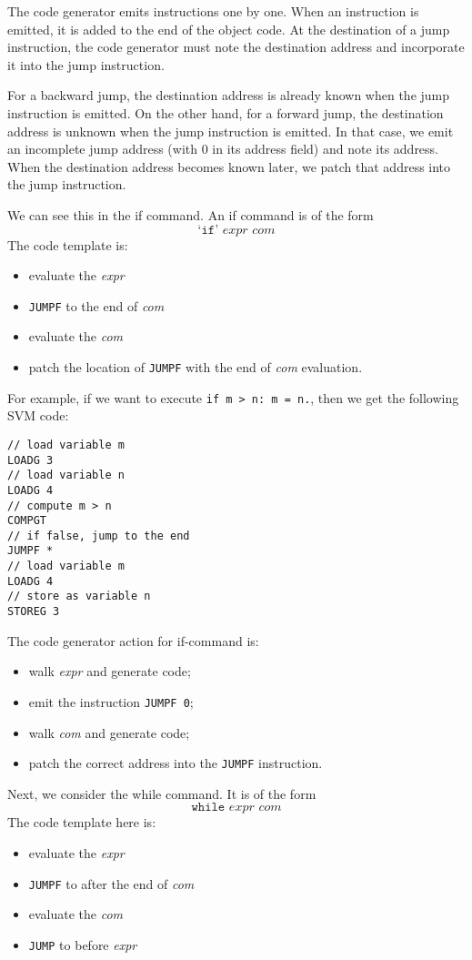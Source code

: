 \documentclass[a4paper, openany]{memoir}
\begin{document}
The code generator emits instructions one by one. When an instruction is emitted, it is added to the end of the object code. At the destination of a jump instruction, the code generator must note the destination address and incorporate it into the jump instruction.

For a backward jump, the destination address is already known when the jump instruction is emitted. On the other hand, for a forward jump, the destination address is unknown when the jump instruction is emitted. In that case, we emit an incomplete jump address (with 0 in its address field) and note its address. When the destination address becomes known later, we patch that address into the jump instruction.

We can see this in the if command. An if command is of the form
\[\text{`}\texttt{if}\text{' } \textit{expr } \textit{com}\]
The code template is:
\begin{itemize}
    \item evaluate the \textit{expr}
    \item \texttt{JUMPF} to the end of \textit{com}
    \item evaluate the \textit{com}
    \item patch the location of \texttt{JUMPF} with the end of \textit{com} evaluation.
\end{itemize}
For example, if we want to execute \texttt{if m > n: m = n.}, then we get the following SVM code:
\begin{lstlisting}[language=SVM]
// load variable m
LOADG 3
// load variable n
LOADG 4
// compute m > n
COMPGT
// if false, jump to the end
JUMPF *
// load variable m
LOADG 4
// store as variable n
STOREG 3
\end{lstlisting}
The code generator action for if-command is:
\begin{itemize}
    \item walk \textit{expr} and generate code;
    \item emit the instruction \texttt{JUMPF 0};
    \item walk \textit{com} and generate code;
    \item patch the correct address into the \texttt{JUMPF} instruction.
\end{itemize}

Next, we consider the while command. It is of the form
\[\texttt{while} \textit{ expr com}\]
The code template here is:
\begin{itemize}
    \item evaluate the \textit{expr}
    \item \texttt{JUMPF} to after the end of \textit{com}
    \item evaluate the \textit{com}
    \item \texttt{JUMP} to before \textit{expr}
\end{itemize}
\end{document}
